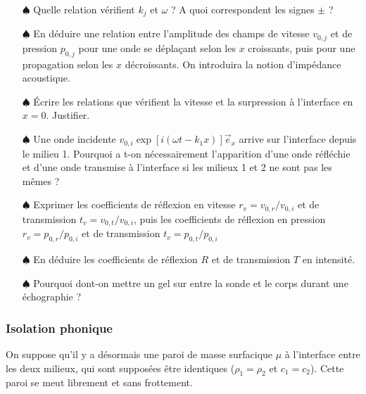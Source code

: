 \documentclass{report}
\begin{document}
\begin{itemize}

	\item[$\spadesuit$] Quelle relation vérifient $k_j$ et $\omega$ ? A quoi correspondent les signes $\pm$ ?
	
	\item[$\spadesuit$] En déduire une relation entre l'amplitude des champs de vitesse $v_{0,j}$ et de pression $p_{0,j}$ pour une onde se déplaçant selon les $x$ croissants, puis pour une propagation selon les $x$ décroissants. On introduira la notion d'impédance acoustique.
	
	\item[$\spadesuit$] Écrire les relations que vérifient la vitesse et la surpression à l'interface en $x=0$. Justifier. 
	
	\item[$\spadesuit$] Une onde incidente $v_{0,i}\exp\left[i(\omega t - k_1x) \right] \vec{e}_x$  arrive sur l'interface depuis le milieu 1. Pourquoi a t-on nécessairement l'apparition d'une onde réfléchie et d'une onde transmise à l'interface si les milieux 1 et 2 ne sont pas les mêmes ?
	
	\item[$\spadesuit$] Exprimer les coefficients de réflexion en vitesse $r_v=v_{0,r}/v_{0,i}$ et de transmission $t_v=v_{0,t}/v_{0,i}$, puis les coefficients de réflexion en pression $r_v=p_{0,r}/p_{0,i}$ et de transmission $t_v=p_{0,t}/p_{0,i}$
	
	\item[$\spadesuit$]	 En déduire les coefficients de réflexion $R$ et de transmission $T$ en intensité. 
	
	\item[$\spadesuit$] Pourquoi dont-on mettre un gel sur entre la sonde et le corps durant une échographie ? 
		
\end{itemize}

\subsubsection*{Isolation phonique}

On suppose qu'il y a désormais une paroi de masse surfacique $\mu$ à l'interface entre les deux milieux, qui sont supposées être identiques ($\rho_1=\rho_2$ et $c_1=c_2$). Cette paroi se meut librement et sans frottement. 
\end{document}
